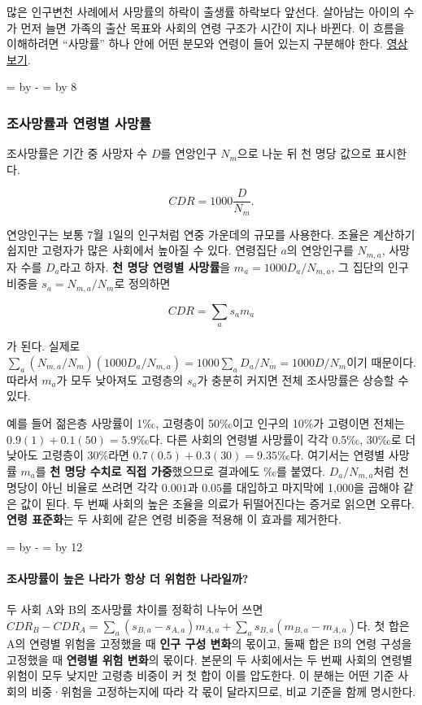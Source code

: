 \documentclass[10pt,a4paper]{article}
\newcommand{\ReserveQuestionSpace}{%
  \par\begingroup
  \dimen0=\pagegoal \advance\dimen0 by -\pagetotal
  \dimen2=\baselineskip \multiply\dimen2 by 12
  \ifdim\dimen0<\dimen2 \newpage\fi
  \endgroup}
\newcommand{\ReserveReadingSectionSpace}{%
  \par\begingroup
  \dimen0=\pagegoal \advance\dimen0 by -\pagetotal
  \dimen2=\baselineskip \multiply\dimen2 by 8
  \ifdim\dimen0<\dimen2 \newpage\fi
  \endgroup}
\begin{document}
많은 인구변천 사례에서 사망률의 하락이 출생률 하락보다 앞선다. 살아남는 아이의 수가 먼저 늘면 가족의 출산 목표와 사회의 연령 구조가 시간이 지나 바뀐다. 이 흐름을 이해하려면 “사망률” 하나 안에 어떤 분모와 연령이 들어 있는지 구분해야 한다. \href{https://youtu.be/953x7Le4PnY}{영상 보기}.\par

\ReserveReadingSectionSpace
\subsubsection*{조사망률과 연령별 사망률}

조사망률은 기간 중 사망자 수 $D$를 연앙인구 $N_m$으로 나눈 뒤 천 명당 값으로 표시한다.\par

\[
CDR=1000\frac{D}{N_m}.
\]

연앙인구는 보통 7월 1일의 인구처럼 연중 가운데의 규모를 사용한다. 조율은 계산하기 쉽지만 고령자가 많은 사회에서 높아질 수 있다. 연령집단 $a$의 연앙인구를 $N_{m,a}$, 사망자 수를 $D_a$라고 하자. \textbf{천 명당 연령별 사망률}을 $m_a=1000D_a/N_{m,a}$, 그 집단의 인구 비중을 $s_a=N_{m,a}/N_m$로 정의하면\par

\[
CDR=\sum_a s_a m_a
\]

가 된다. 실제로 $\sum_a(N_{m,a}/N_m)(1000D_a/N_{m,a})=1000\sum_aD_a/N_m=1000D/N_m$이기 때문이다. 따라서 $m_a$가 모두 낮아져도 고령층의 $s_a$가 충분히 커지면 전체 조사망률은 상승할 수 있다.\par

예를 들어 젊은층 사망률이 1‰, 고령층이 50‰이고 인구의 10\%가 고령이면 전체는 $0.9(1)+0.1(50)=5.9$‰다. 다른 사회의 연령별 사망률이 각각 0.5‰, 30‰로 더 낮아도 고령층이 30\%라면 $0.7(0.5)+0.3(30)=9.35$‰다. 여기서는 연령별 사망률 $m_a$를 \textbf{천 명당 수치로 직접 가중}했으므로 결과에도 ‰를 붙였다. $D_a/N_{m,a}$처럼 천 명당이 아닌 비율로 쓰려면 각각 $0.001$과 $0.05$를 대입하고 마지막에 1,000을 곱해야 같은 값이 된다. 두 번째 사회의 높은 조율을 의료가 뒤떨어진다는 증거로 읽으면 오류다. \textbf{연령 표준화}는 두 사회에 같은 연령 비중을 적용해 이 효과를 제거한다.\par

\ReserveQuestionSpace
\paragraph{조사망률이 높은 나라가 항상 더 위험한 나라일까?}
두 사회 A와 B의 조사망률 차이를 정확히 나누어 쓰면 $CDR_B-CDR_A=\sum_a(s_{B,a}-s_{A,a})m_{A,a}+\sum_a s_{B,a}(m_{B,a}-m_{A,a})$다. 첫 합은 A의 연령별 위험을 고정했을 때 \textbf{인구 구성 변화}의 몫이고, 둘째 합은 B의 연령 구성을 고정했을 때 \textbf{연령별 위험 변화}의 몫이다. 본문의 두 사회에서는 두 번째 사회의 연령별 위험이 모두 낮지만 고령층 비중이 커 첫 합이 이를 압도한다. 이 분해는 어떤 기준 사회의 비중·위험을 고정하는지에 따라 각 몫이 달라지므로, 비교 기준을 함께 명시한다.\par
\end{document}
